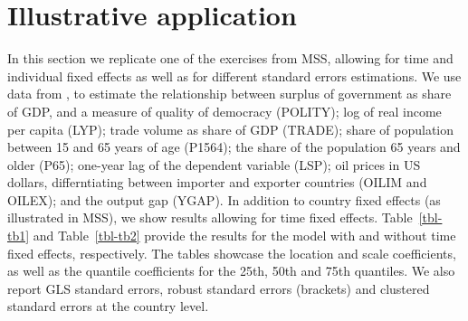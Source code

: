 \documentclass[
  authoryear,
  review,
  1p]{elsarticle}
\begin{document}
\section{Illustrative application}\label{illustrative-application}

In this section we replicate one of the exercises from MSS, allowing for
time and individual fixed effects as well as for different standard
errors estimations. We use data from \citet{persson_economic_2005}, to
estimate the relationship between surplus of government as share of GDP,
and a measure of quality of democracy (POLITY); log of real income per
capita (LYP); trade volume as share of GDP (TRADE); share of population
between 15 and 65 years of age (P1564); the share of the population 65
years and older (P65); one-year lag of the dependent variable (LSP); oil
prices in US dollars, differntiating between importer and exporter
countries (OILIM and OILEX); and the output gap (YGAP). In addition to
country fixed effects (as illustrated in MSS), we show results allowing
for time fixed effects. Table~\ref{tbl-tb1} and Table~\ref{tbl-tb2}
provide the results for the model with and without time fixed effects,
respectively. The tables showcase the location and scale coefficients,
as well as the quantile coefficients for the 25th, 50th and 75th
quantiles. We also report GLS standard errors, robust standard errors
(brackets) and clustered standard errors at the country level.
\end{document}
